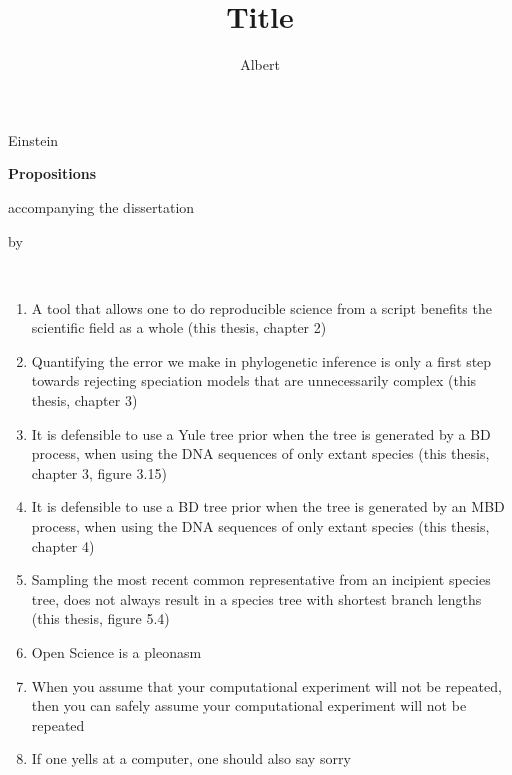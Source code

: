 \documentclass{propositions}
\begin{document}
\title[Optional Subtitle]{Title}
\author{Albert}{Einstein}

\begin{center}

{\Large\titlefont\bfseries Propositions}

\bigskip

accompanying the dissertation

\bigskip

{\makeatletter
\titlestyle\bfseries\large\@title
\makeatother}

{\makeatletter
\ifx\@subtitle\undefined\else
    \titlefont\titleshape\@subtitle
\fi
\makeatother}

\bigskip

by

\bigskip

\makeatletter
{\large\titlefont\bfseries\@firstname\ {\titleshape\@lastname}}
\makeatother

\end{center}

\bigskip
\bigskip

\begin{enumerate}

\item A tool that allows one to do reproducible science from a script
      benefits the scientific field as a whole (this thesis, chapter 2)
\item Quantifying the error we make in phylogenetic inference is
      only a first step towards rejecting speciation models that are
      unnecessarily complex (this thesis, chapter 3)
\item It is defensible to use a Yule tree prior when the tree
      is generated by a BD process, when using the DNA sequences
      of only extant species (this thesis, chapter 3, figure 3.15)
\item It is defensible to use a BD tree prior when the tree
      is generated by an MBD process, when using the DNA sequences
      of only extant species (this thesis, chapter 4)
\item Sampling the most recent common representative from an incipient
      species tree, does not always result in a species tree with shortest
      branch lengths (this thesis, figure 5.4)
\item Open Science is a pleonasm
\item When you assume that your computational experiment will not be repeated,
      then you can safely assume your computational experiment will not be repeated
\item If one yells at a computer, one should also say sorry
\end{enumerate}
\end{document}
